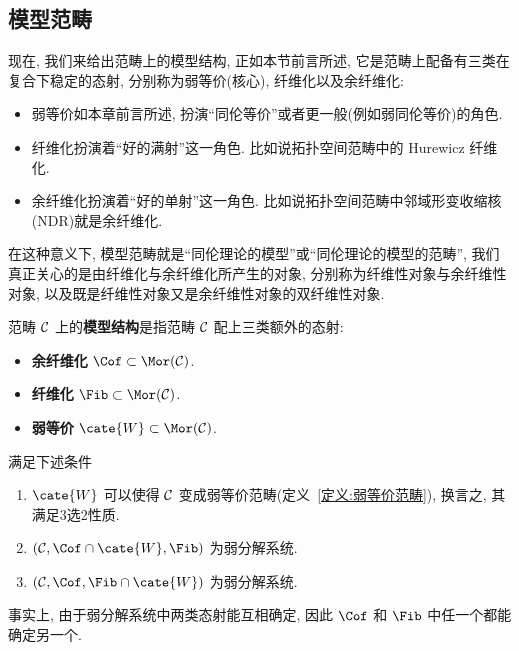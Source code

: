 \subsection{模型范畴}\label{模型范畴定义}
现在, 我们来给出范畴上的模型结构, 正如本节前言所述, 它是范畴上配备有三类在复合下稳定的态射, 分别称为弱等价(核心), 纤维化以及余纤维化:
\begin{itemize}
    \item 弱等价如本章前言所述, 扮演``同伦等价''或者更一般(例如弱同伦等价)的角色.
    \item 纤维化扮演着``好的满射''这一角色. 比如说拓扑空间范畴中的 Hurewicz 纤维化.
    \item 余纤维化扮演着``好的单射''这一角色. 比如说拓扑空间范畴中邻域形变收缩核(NDR)就是余纤维化.
\end{itemize}
在这种意义下, 模型范畴就是``同伦理论的模型''或``同伦理论的模型的范畴'', 我们真正关心的是由纤维化与余纤维化所产生的对象, 分别称为纤维性对象与余纤维性对象, 以及既是纤维性对象又是余纤维性对象的双纤维性对象.
\begin{definition}[模型结构]
    范畴 $\cal{C}$ 上的\textbf{模型结构}是指范畴 $\cal{C}$ 配上三类额外的态射:
    \begin{itemize}
        \item \textbf{余纤维化} $\Cof \subset \Mor(\cal{C})$.
        \item \textbf{纤维化} $\Fib \subset \Mor(\cal{C})$.
        \item \textbf{弱等价} $\cate{W} \subset \Mor(\cal{C})$.
    \end{itemize}
    满足下述条件
    \begin{enumerate}
        \item $\cate{W}$ 可以使得 $\cal{C}$ 变成弱等价范畴(定义~\ref{定义:弱等价范畴}), 换言之, 其满足3选2性质.
        \item $(\mathcal{C},\Cof\cap \cate{W}, \Fib)$ 为弱分解系统.
        \item $(\mathcal{C},\Cof, \Fib\cap \cate{W})$ 为弱分解系统.
    \end{enumerate}
\end{definition}
事实上, 由于弱分解系统中两类态射能互相确定, 因此 $\Cof$ 和 $\Fib$ 中任一个都能确定另一个.

